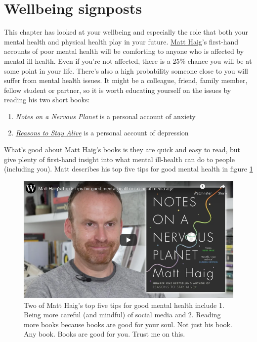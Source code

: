 \documentclass[
]{book}
\providecommand{\tightlist}{%
  \setlength{\itemsep}{0pt}\setlength{\parskip}{0pt}}
\begin{document}
\hypertarget{signposts3}{%
\section{Wellbeing signposts}\label{signposts3}}

This chapter has looked at your wellbeing and especially the role that both your mental health and physical health play in your future. \href{https://en.wikipedia.org/wiki/Matt_Haig}{Matt Haig}'s first-hand accounts of poor mental health will be comforting to anyone who is affected by mental ill health. Even if you're not affected, there is a 25\% chance you will be at some point in your life. There's also a high probability someone close to you will suffer from mental health issues. It might be a colleague, friend, family member, fellow student or partner, so it is worth educating yourself on the issues by reading his two short books:

\begin{enumerate}
\def\labelenumi{\arabic{enumi}.}
\tightlist
\item
  \emph{Notes on a Nervous Planet} is a personal account of anxiety \citep{nervousplanet}
\item
  \emph{\href{https://en.wikipedia.org/wiki/Reasons_to_Stay_Alive}{Reasons to Stay Alive}} is a personal account of depression \citep{stayalive}
\end{enumerate}

What's good about Matt Haig's books is they are quick and easy to read, but give plenty of first-hand insight into what mental ill-health can do to people (including you). Matt describes his top five tips for good mental health in figure \ref{fig:haig-fig}

\begin{figure}

{\centering \includegraphics[width=0.99\linewidth]{images/youtube-haig} 

}

\caption{Two of Matt Haig's top five tips for good mental health \citep{youtube-haig} include 1. Being more careful (and mindful) of social media and 2. Reading more books because books are good for your soul. Not just his book. Any book. Books are good for you. Trust me on this. \citep{bookfriends}}\label{fig:haig-fig}
\end{figure}
\end{document}
